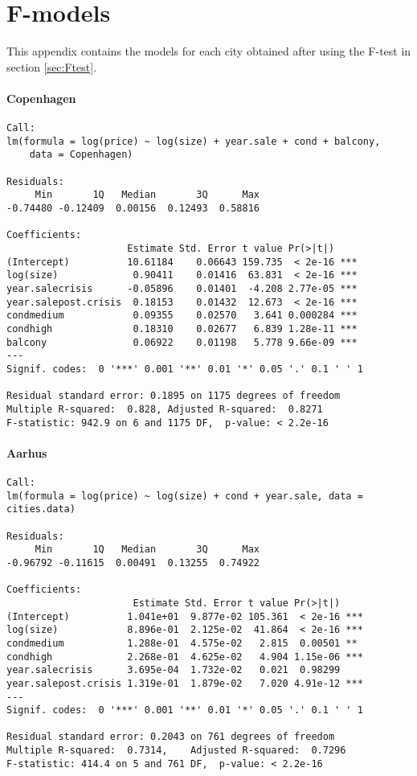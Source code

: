 \chapter{F-models}

This appendix contains the models for each city obtained after using the F-test in section \ref{sec:Ftest}.

\subsubsection{Copenhagen}
\begin{lstlisting}
Call:
lm(formula = log(price) ~ log(size) + year.sale + cond + balcony, 
    data = Copenhagen)

Residuals:
     Min       1Q   Median       3Q      Max 
-0.74480 -0.12409  0.00156  0.12493  0.58816 

Coefficients:
                     Estimate Std. Error t value Pr(>|t|)    
(Intercept)          10.61184    0.06643 159.735  < 2e-16 ***
log(size)             0.90411    0.01416  63.831  < 2e-16 ***
year.salecrisis      -0.05896    0.01401  -4.208 2.77e-05 ***
year.salepost.crisis  0.18153    0.01432  12.673  < 2e-16 ***
condmedium            0.09355    0.02570   3.641 0.000284 ***
condhigh              0.18310    0.02677   6.839 1.28e-11 ***
balcony               0.06922    0.01198   5.778 9.66e-09 ***
---
Signif. codes:  0 '***' 0.001 '**' 0.01 '*' 0.05 '.' 0.1 ' ' 1

Residual standard error: 0.1895 on 1175 degrees of freedom
Multiple R-squared:  0.828,	Adjusted R-squared:  0.8271 
F-statistic: 942.9 on 6 and 1175 DF,  p-value: < 2.2e-16
\end{lstlisting}

\subsubsection{Aarhus}
\begin{lstlisting}
Call:
lm(formula = log(price) ~ log(size) + cond + year.sale, data = cities.data)

Residuals:
     Min       1Q   Median       3Q      Max 
-0.96792 -0.11615  0.00491  0.13255  0.74922 

Coefficients:
                      Estimate Std. Error t value Pr(>|t|)    
(Intercept)          1.041e+01  9.877e-02 105.361  < 2e-16 ***
log(size)            8.896e-01  2.125e-02  41.864  < 2e-16 ***
condmedium           1.288e-01  4.575e-02   2.815  0.00501 ** 
condhigh             2.268e-01  4.625e-02   4.904 1.15e-06 ***
year.salecrisis      3.695e-04  1.732e-02   0.021  0.98299    
year.salepost.crisis 1.319e-01  1.879e-02   7.020 4.91e-12 ***
---
Signif. codes:  0 '***' 0.001 '**' 0.01 '*' 0.05 '.' 0.1 ' ' 1

Residual standard error: 0.2043 on 761 degrees of freedom
Multiple R-squared:  0.7314,	Adjusted R-squared:  0.7296 
F-statistic: 414.4 on 5 and 761 DF,  p-value: < 2.2e-16
\end{lstlisting}


